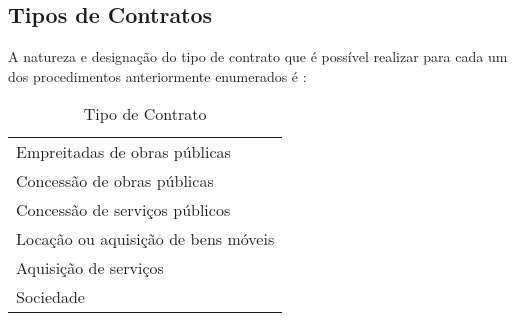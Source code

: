 
\subsection{Tipos de Contratos}

A natureza e designação do tipo de contrato que é possível realizar para cada um dos procedimentos anteriormente enumerados é : 


\begin{table}[h!]
	\centering
	\begin{tabular}{|l|}
		\hline
		\rowcolor[HTML]{B1DEFF} 
		\multicolumn{1}{|c|}{\cellcolor[HTML]{B1DEFF}\textbf{Tipo de Contrato}} \\ \hline
		Empreitadas de obras públicas                                           \\ \hline
		Concessão de obras públicas                                             \\ \hline
		Concessão de serviços públicos                                          \\ \hline
		Locação ou aquisição de bens móveis                                     \\ \hline
		Aquisição de serviços                                                   \\ \hline
		Sociedade                                                               \\ \hline
	\end{tabular}
	\caption{Tipo de Contrato}
	\label{}
\end{table}



